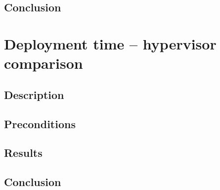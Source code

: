 \subsection*{Conclusion}


\section{Deployment time -- hypervisor comparison}
\subsection*{Description}
\subsection*{Preconditions}
\subsection*{Results}
\subsection*{Conclusion}

